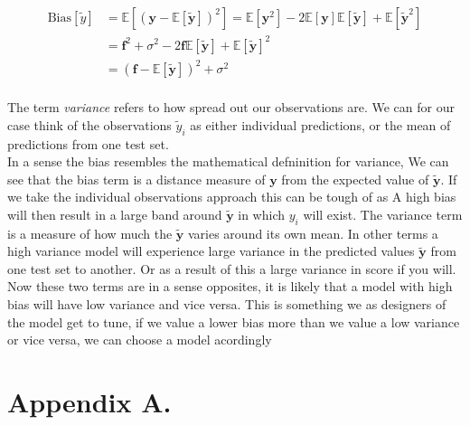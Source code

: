 \documentclass[twoside,11pt]{report}
\begin{document}
\begin{align*}
\mathrm{Bias}[\tilde{y}]& =\mathbb{E}\left[\left(\boldsymbol{y}-\mathbb{E}\left[\boldsymbol{\tilde{y}}\right]\right)^2\right] = \mathbb{E}[\boldsymbol{y}^2] - 2\mathbb{E}[\boldsymbol{y}]\mathbb{E}[\boldsymbol{\tilde{y}}] + \mathbb{E}[\boldsymbol{\tilde{y}}^2]\\
& = \boldsymbol{f}^2 + \sigma^2 - 2\boldsymbol{f}\mathbb{E}[\boldsymbol{\tilde{y}}] + \mathbb{E}[\boldsymbol{\tilde{y}}]^2\\
& = (\boldsymbol{f} - \mathbb{E}[\boldsymbol{\tilde{y}}])^2 + \sigma^2\\
\end{align*}



The term \emph{variance} refers to how spread out our observations are. We can for our case think of the observations $\tilde{y}_i$
as either individual predictions, or the mean of predictions from one test set.\\
In a sense the bias resembles the mathematical defninition for variance, We can see that the bias term is a distance measure of $\boldsymbol{y}$ from the expected value of $\boldsymbol{\tilde{y}}$. If we take the individual observations approach this can be tough of as A high bias will then result in a large band around $\boldsymbol{\tilde{y}}$ in which $y_i$ will exist. The variance term is a measure of how much the $\boldsymbol{\tilde{y}}$ varies around its own mean. In other terms a high variance model will experience large variance in the predicted values $\boldsymbol{\tilde{y}}$ from one test set to another. Or as a result of this a large variance in score if you will. Now these two terms are in a sense opposites, it is likely that a model with high bias will have low variance and vice versa. This is something we as designers of the model get to tune, if we value a lower bias more than we value a low variance or vice versa, we can choose a model acordingly

\acks{}


\newpage

\appendix
\section*{Appendix A.}
\label{app:theorem}




\vskip 0.2in

% 

\end{document}
